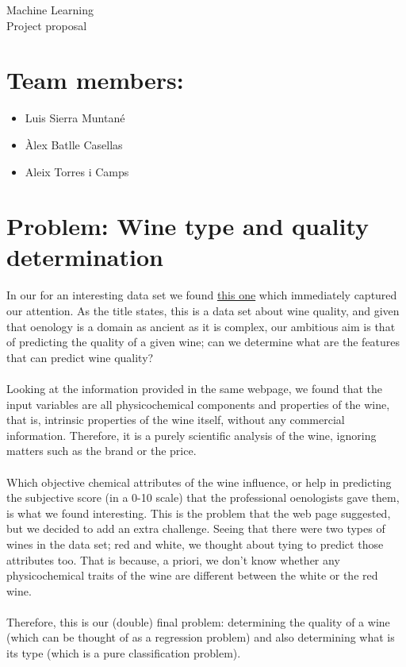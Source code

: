 \documentclass[10pt]{article}
\begin{document}
\begingroup
  \centering
  \Huge Machine Learning \\
  \vskip 0.5cm
  \LARGE Project proposal\\[1.5em]
\endgroup

\section{Team members:}
\begin{itemize}
  \item Luis Sierra Muntané
  \item Àlex Batlle Casellas
  \item Aleix Torres i Camps
\end{itemize}
\vskip 0.3cm

\section{Problem: \color{violet} Wine type and quality determination}

In our for an interesting data set we found \href{http://archive.ics.uci.edu/ml/datasets/Wine+Quality}{this one} which immediately captured our attention. As the title states, this is a data set about wine quality, and given that oenology is a domain as ancient as it is complex, our ambitious aim is that of predicting the quality of a given wine; can we determine what are the features that can predict wine quality?
\\ \ \\
Looking at the information provided in the same webpage, we found that the input variables are all physicochemical components and properties of the wine, that is, intrinsic properties of the wine itself, without any commercial information. Therefore, it is a purely scientific analysis of the wine, ignoring matters such as the brand or the price.
\\ \ \\
Which objective chemical attributes of the wine influence, or help in predicting the subjective score (in a 0-10 scale) that the professional oenologists gave them, is what we found interesting. This is the problem that the web page suggested, but we decided to add an extra challenge. Seeing that there were two types of wines in the data set; red and white, we thought about tying to predict those attributes too. That is because, a priori, we don't know whether any physicochemical traits of the wine are different between the white or the red wine.
\\ \ \\
Therefore, this is our (double) final problem: determining the quality of a wine (which can be thought of as a regression problem) and also determining what is its type (which is a pure classification problem).
\\ 
\end{document}
